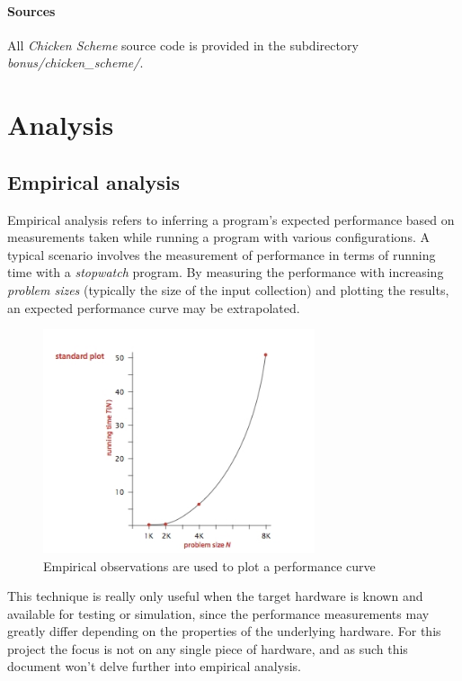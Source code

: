 \documentclass{article}
\begin{document}
\paragraph{Sources}
All {\em Chicken Scheme} source code is provided in the subdirectory {\em bonus/chicken\_scheme/}.


\newpage


\section{Analysis}

\subsection{Empirical analysis}
Empirical analysis refers to inferring a program's expected performance based on measurements taken while running a
program with various configurations. A typical scenario involves the measurement of performance in terms of running
time with a {\em stopwatch} program. By measuring the performance with increasing {\em problem sizes} (typically the
size of the input collection) and plotting the results, an expected performance curve may be extrapolated.

\begin{figure}[H]
  \centering
  \includegraphics[width=8cm]{empirical_measurement}
  \caption{Empirical observations are used to plot a performance curve}
\end{figure}

This technique is really only useful when the target hardware is known and available for testing or simulation, since the
performance measurements may greatly differ depending on the properties of the underlying hardware. For this project the
focus is not on any single piece of hardware, and as such this document won't delve further into empirical analysis.
\end{document}
